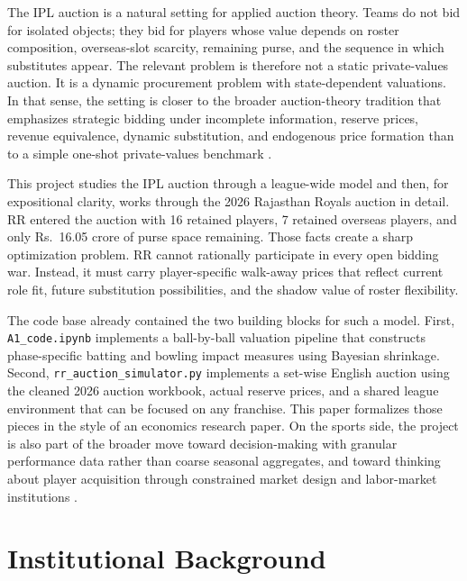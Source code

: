 \documentclass[11pt]{article}
\begin{document}
The IPL auction is a natural setting for applied auction theory. Teams do not bid for isolated objects; they bid for players whose value depends on roster composition, overseas-slot scarcity, remaining purse, and the sequence in which substitutes appear. The relevant problem is therefore not a static private-values auction. It is a dynamic procurement problem with state-dependent valuations. In that sense, the setting is closer to the broader auction-theory tradition that emphasizes strategic bidding under incomplete information, reserve prices, revenue equivalence, dynamic substitution, and endogenous price formation than to a simple one-shot private-values benchmark \citep{vickrey1961,wilson1979,milgromweber1982,myerson1981,bulowklemperer1996,klemperer1999,krishna2009,ausubel2004}.

This project studies the IPL auction through a league-wide model and then, for expositional clarity, works through the 2026 Rajasthan Royals auction in detail. RR entered the auction with 16 retained players, 7 retained overseas players, and only Rs.\ 16.05 crore of purse space remaining. Those facts create a sharp optimization problem. RR cannot rationally participate in every open bidding war. Instead, it must carry player-specific walk-away prices that reflect current role fit, future substitution possibilities, and the shadow value of roster flexibility.

The code base already contained the two building blocks for such a model. First, \texttt{A1\_code.ipynb} implements a ball-by-ball valuation pipeline that constructs phase-specific batting and bowling impact measures using Bayesian shrinkage. Second, \texttt{rr\_auction\_simulator.py} implements a set-wise English auction using the cleaned 2026 auction workbook, actual reserve prices, and a shared league environment that can be focused on any franchise. This paper formalizes those pieces in the style of an economics research paper. On the sports side, the project is also part of the broader move toward decision-making with granular performance data rather than coarse seasonal aggregates, and toward thinking about player acquisition through constrained market design and labor-market institutions \citep{rottenberg1956,scully1974,kahn2000,lewis2004,alamar2013,masseythaler2013}.

\section{Institutional Background}
\end{document}
